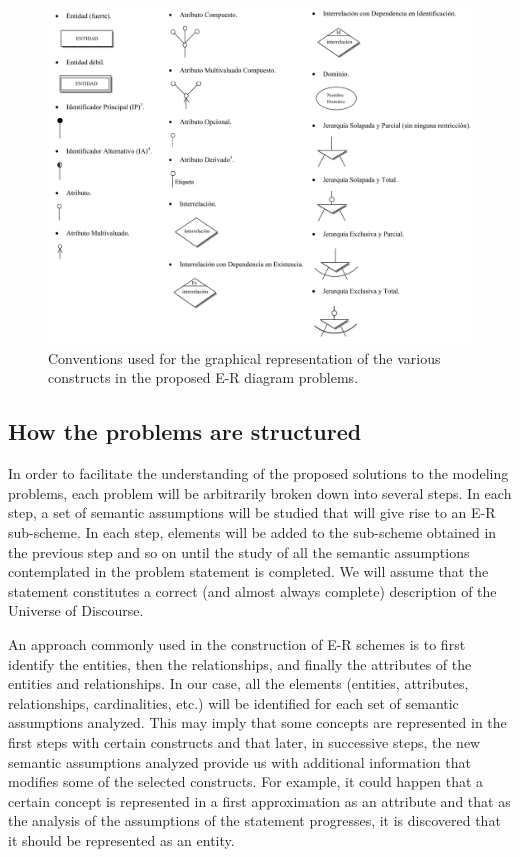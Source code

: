 \documentclass{article}
\numberwithin{figure}{section}
\begin{document}
\begin{figure}
    \centering
    \includegraphics[width=\textwidth]{figures/erd_notation}
    \caption{Conventions used for the graphical representation of the various constructs in the proposed E-R diagram problems.}
    \label{fig:notation}
\end{figure}

\subsection{How the problems are structured}

In order to facilitate the understanding of the proposed solutions to the modeling problems, each problem will be arbitrarily broken down into several steps.  In each step, a set of semantic assumptions will be studied that will give rise to an E-R sub-scheme.  In each step, elements will be added to the sub-scheme obtained in the previous step and so on until the study of all the semantic assumptions contemplated in the problem statement is completed.  We will assume that the statement constitutes a correct (and almost always complete) description of the Universe of Discourse.

An approach commonly used in the construction of E-R schemes is to first identify the entities, then the relationships, and finally the attributes of the entities and relationships.  In our case, all the elements (entities, attributes, relationships, cardinalities, etc.) will be identified for each set of semantic assumptions analyzed.  This may imply that some concepts are represented in the first steps with certain constructs and that later, in successive steps, the new semantic assumptions analyzed provide us with additional information that modifies some of the selected constructs.  For example, it could happen that a certain concept is represented in a first approximation as an attribute and that as the analysis of the assumptions of the statement progresses, it is discovered that it should be represented as an entity.
\end{document}
